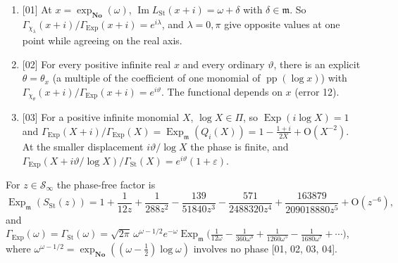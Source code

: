 \documentclass[11pt,a4paper]{article}
\numberwithin{equation}{section}
\theoremstyle{definition}
\theoremstyle{remark}
\newcommand{\No}{\mathbf{No}}
\newcommand{\mm}{\mathfrak m}
\newcommand{\eps}{\varepsilon}
\renewcommand{\Im}{\operatorname{Im}}
\newcommand{\pp}{\operatorname{pp}}
\newcommand{\Exp}{\operatorname{Exp}}
\newcommand{\Ex}{\operatorname{Exp}_{\mm}}
\newcommand{\LSt}{L_{\mathrm{St}}}
\newcommand{\GSt}{\Gamma_{\mathrm{St}}}
\newcommand{\SSt}{S_{\mathrm{St}}}
\newcommand{\Sinf}{\mathcal S_{\infty}}
\newcommand{\src}[1]{\textup{[#1]}}
\newcommand{\bigO}{\mathrm{O}}
\begin{document}
\begin{example}[Phase dependence \src{01, 02, 03}]\label{gz:ex:phasedep}
\leavevmode
\begin{enumerate}[label=(\alph*)]
\item \src{01} At $x=\exp_{\No}(\omega)$, $\Im\LSt(x+i)=\omega+\delta$ with
 $\delta\in\mm$. So $\Gamma_{\chi_\lambda}(x+i)/\Gamma_{\Exp}(x+i)=e^{i\lambda}$,
 and $\lambda=0,\pi$ give opposite values at one point while agreeing on the
 real axis.
\item \src{02} For every positive infinite real $x$ and every ordinary
 $\vartheta$, there is an explicit $\theta=\theta_x$ (a multiple of the
 coefficient of one monomial of $\pp(\log x)$) with
 $\Gamma_{\chi_\theta}(x+i)/\Gamma_{\Exp}(x+i)=e^{i\vartheta}$. The functional
 depends on $x$ (error 12).
\item \src{03} For a positive infinite monomial $X$, $\log X\in\Pi$, so
 $\Exp(i\log X)=1$ and
 $\Gamma_{\Exp}(X+i)/\Gamma_{\Exp}(X)=\Ex(Q_i(X))=1-\frac{1+i}{2X}+\bigO(X^{-2})$.
 At the smaller displacement $i\vartheta/\log X$ the phase is finite, and
 $\Gamma_{\Exp}(X+i\vartheta/\log X)/\GSt(X)=e^{i\vartheta}(1+\eps)$.
\end{enumerate}
\end{example}
For $z\in\Sinf$ the phase-free factor is
\[
\Ex(\SSt(z))=1+\frac1{12z}+\frac1{288z^2}-\frac{139}{51840z^3}-\frac{571}{2488320z^4}+\frac{163879}{209018880z^5}+\bigO(z^{-6}),
\]
and
$\Gamma_{\Exp}(\omega)=\GSt(\omega)=\sqrt{2\pi}\,\omega^{\omega-1/2}e^{-\omega}\Ex\bigl(\frac1{12\omega}-\frac1{360\omega^3}+\frac1{1260\omega^5}-\frac1{1680\omega^7}+\cdots\bigr)$,
where $\omega^{\omega-1/2}=\exp_{\No}((\omega-\tfrac12)\log\omega)$ involves no
phase \src{01, 02, 03, 04}.
\end{document}
